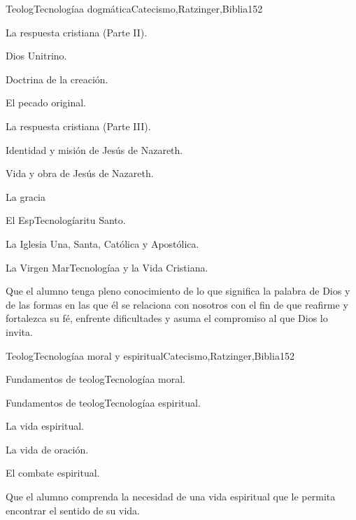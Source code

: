 \begin{syllabus}
\begin{unit}{TeologTecnologíaa dogmática}{Catecismo,Ratzinger,Biblia}{15}{2}
\begin{topics}
	\item La respuesta cristiana (Parte II). 
	      \begin{inparaenum}
		  \item Dios Unitrino.
		  \item Doctrina de la creación.
		  \item El pecado original.
	      \end{inparaenum}
	 \item La respuesta cristiana (Parte III). 
	      \begin{inparaenum}
		  \item Identidad y misión de Jesús de Nazareth.
		  \item Vida y obra de Jesús de Nazareth.
		  \item La gracia
		  \item El EspTecnologíaritu Santo.
		  \item La Iglesia Una, Santa, Católica y Apostólica.
		  \item La Virgen MarTecnologíaa y la Vida Cristiana.
	      \end{inparaenum}
\end{topics}
\begin{unitgoals}
	\item Que el alumno tenga pleno conocimiento de lo que significa la palabra de Dios y de las formas en las que él se relaciona con nosotros con el fin de que reafirme y fortalezca su fé, enfrente dificultades y asuma el compromiso al que Dios lo invita.
\end{unitgoals}
\end{unit}

\begin{unit}{TeologTecnologíaa moral y espiritual}{Catecismo,Ratzinger,Biblia}{15}{2}
\begin{topics}
      \item Fundamentos de teologTecnologíaa moral.
      \item Fundamentos de teologTecnologíaa espiritual.
      \item La vida espiritual.
      \item La vida de oración.
      \item El combate espiritual.
\end{topics}

\begin{unitgoals}
      \item Que el alumno comprenda la necesidad de una vida espiritual que le permita encontrar el sentido de su vida.
\end{unitgoals}
\end{unit}



\begin{coursebibliography}
\end{coursebibliography}

\end{syllabus}
